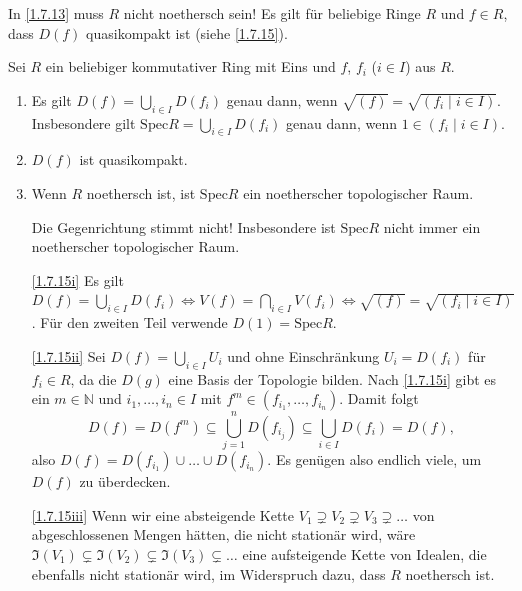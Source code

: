 \documentclass[a4paper,12pt]{scrbook}
\makeatletter
\theoremstyle{blah}
\theoremstyle{stz}
\renewcommand{\proofname}{Beweis}
\renewenvironment{proof}[1][\proofname]{\par
  \pushQED{\qed}%
  \normalfont \topsep6\p@\@plus6\p@\relax
  \trivlist
  \item[\hskip\labelsep
        \itshape
    #1\@addpunct{:}]\ignorespaces
}{%
  \popQED\endtrivlist\@endpefalse
}
\def\I{\mathfrak{I}}
\newcommand{\Spec}{\mathrm{Spec}}
\newcommand{\set}[1]{\ensuremath{\mathbb{#1}}}
\newcommand{\N}{\set{N}}
\makeatother
\begin{document}
\begin{bem*}
  In \autoref{1.7.13} muss $R$ nicht noethersch sein! Es gilt für beliebige Ringe $R$ und $f\in R$, dass $D(f)$ quasikompakt ist
  (siehe \autoref{1.7.15}).
\end{bem*}

\begin{bem}\label{1.7.15}
  Sei $R$ ein beliebiger kommutativer Ring mit Eins und $f$, $f_i$ ($i\in I$) aus $R$.
  \begin{enumerate}
  \item\label{1.7.15i} Es gilt $\displaystyle D(f)=\bigcup_{i\in I}D(f_i)$ genau dann, wenn $\sqrt{(f)}=\sqrt{(f_i\mid i\in
      I)}$. Insbesondere gilt $\displaystyle\Spec R=\bigcup_{i\in I}D(f_i)$ genau dann, wenn $1\in(f_i\mid i\in I)$.
  \item\label{1.7.15ii} $D(f)$ ist quasikompakt.
  \item\label{1.7.15iii} Wenn $R$ noethersch ist, ist $\Spec R$ ein noetherscher topologischer Raum.
    \begin{w}
      Die Gegenrichtung stimmt nicht! Insbesondere ist $\Spec R$ nicht immer ein noetherscher topologischer Raum.
    \end{w}
  \end{enumerate}
\end{bem}
\begin{proof}
  \begin{enumerate}
  \item[\ref{1.7.15i}] Es gilt $\displaystyle D(f)=\bigcup_{i\in I}D(f_i) \iff V(f)=\bigcap_{i\in I}V(f_i) \iff
    \sqrt{(f)}=\sqrt{(f_i\mid i\in I)}$. Für den zweiten Teil verwende $D(1)=\Spec R$.
  \item[\ref{1.7.15ii}] Sei $D(f)=\bigcup_{i\in I} U_i$ und ohne Einschränkung $U_i=D(f_i)$ für $f_i\in R$, da die $D(g)$ eine
    Basis der Topologie bilden. Nach \ref{1.7.15i} gibt es ein $m\in\N$ und $i_1,\dotsc,i_n\in I$ mit
    $f^m\in(f_{i_1},\dotsc,f_{i_n})$. Damit folgt \[ D(f)=D(f^m)\subseteq\bigcup_{j=1}^n D(f_{i_j}) \subseteq\bigcup_{i\in I}
    D(f_i) = D(f), \] also $D(f)=D(f_{i_1})\cup\dotso\cup D(f_{i_n})$. Es genügen also endlich viele, um $D(f)$ zu überdecken.
  \item[\ref{1.7.15iii}] Wenn wir eine absteigende Kette $V_1\supsetneq V_2\supsetneq V_3\supsetneq\dotso$ von abgeschlossenen
    Mengen hätten, die nicht stationär wird, wäre $\I(V_1)\subsetneq\I(V_2)\subsetneq\I(V_3)\subsetneq\dotso$ eine aufsteigende
    Kette von Idealen, die ebenfalls nicht stationär wird, im Widerspruch dazu, dass $R$ noethersch ist.
  \end{enumerate}
\end{proof}
\end{document}
